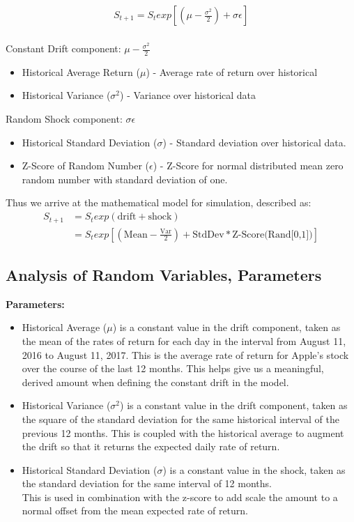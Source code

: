 \documentclass{article}
\begin{document}
\begin{align*}
S_{t+1} = S_{t}exp\left [ \left ( \mu -\frac{\sigma ^{2}}{2} \right ) +\sigma \epsilon \right ] \\
\end{align*}

Constant Drift component: $\mu - \frac{\sigma ^{2}}{2}$
\begin{itemize}
\item Historical Average Return ($\mu$)  - Average rate of return over historical
\item Historical Variance ($\sigma^{2}$) - Variance over historical data
\end{itemize}

Random Shock component: $\sigma \epsilon$
\begin{itemize}
\item Historical Standard Deviation ($\sigma$) - Standard deviation over historical data.
\item Z-Score of Random Number ($\epsilon$) - Z-Score for normal distributed mean zero random number with standard deviation of one.
\end{itemize}

Thus we arrive at the mathematical model for simulation, described as:
\begin{align*}
S_{t+1} &= S_{t}exp( \text{drift} + \text{shock} ) \\
&= S_{t}exp \left [ \left ( \text{Mean} - \frac{\text{Var}}{2} \right ) + \text{StdDev} * \text{Z-Score(Rand[0,1])} \right ]
\end{align*}

\subsection{Analysis of Random Variables, Parameters}

\noindent\textbf{Parameters:}\\
\begin{itemize}
\item Historical Average ($\mu$) is a constant value in the drift component, taken as the mean of the rates of return for each day in the interval from August 11, 2016 to August 11, 2017. This is the average rate of return for Apple's stock over the course of the last 12 months. This helps give us a meaningful, derived amount when defining the constant drift in the model.
\item Historical Variance ($\sigma ^{2}$) is a constant value in the drift component, taken as the square of the standard deviation for the same historical interval of the previous 12 months. This is coupled with the historical average to augment the drift so that it returns the expected daily rate of return.
\end{itemize}
\begin{itemize}
\item Historical Standard Deviation ($\sigma$) is a constant value in the shock, taken as the standard deviation for the same interval of 12 months.\\ This is used in combination with the z-score to add scale the amount to a normal offset from the mean expected rate of return.
\end{itemize}
\end{document}
